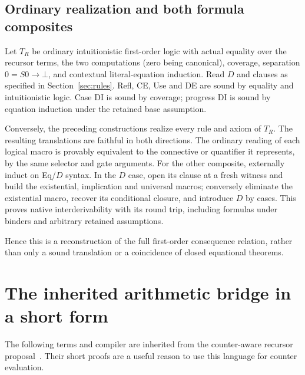 \documentclass[11pt,letterpaper]{article}
\theoremstyle{definition}
\newcommand{\TR}{T_R}
\begin{document}
\subsection{Ordinary realization and both formula composites}

Let $\TR$ be ordinary intuitionistic first-order logic with actual
equality over the recursor terms, the two computations (zero being
canonical), coverage, separation $0=S0\to\bot$, and contextual
literal-equation induction. Read $D$ and clauses as specified in
Section~\ref{sec:rules}. Refl, CE, Use and DE are sound by equality
and intuitionistic logic. Case DI is sound by coverage; progress DI
is sound by equation induction under the retained base assumption.

Conversely, the preceding constructions realize every rule and axiom
of $\TR$. The resulting translations are faithful in both directions.
The ordinary reading of each logical macro is provably equivalent to
the connective or quantifier it represents, by the same selector and
gate arguments. For the other composite, externally induct on Eq/$D$
syntax. In the $D$ case, open its clause at a fresh witness and build
the existential, implication and universal macros; conversely eliminate
the existential macro, recover its conditional closure, and introduce
$D$ by cases. This proves native interderivability with its round trip,
including formulas under binders and arbitrary retained assumptions.

Hence this is a reconstruction of the full first-order consequence
relation, rather than only a sound translation or a coincidence of
closed equational theorems.

\section{The inherited arithmetic bridge in a short form}
\label{sec:arithmetic-bridge}

The following terms and compiler are inherited from the counter-aware
recursor proposal~\cite{counter,scalar}. Their short proofs are a useful
reason to use this language for counter evaluation.
\end{document}
